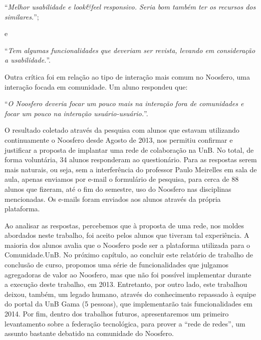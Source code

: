 \begin{center}
``\textit{Melhor usabilidade e look\&feel responsivo. Seria bom também ter os
recursos dos similares.}'';
\end{center}

e

\begin{center}
``\textit{Tem algumas funcionalidades que deveriam ser revista, levando em
consideração a usabilidade.}''.
\end{center}

Outra crítica foi em relação ao tipo de interação mais comum no Noosfero,
uma interação focada em comunidade. Um aluno respondeu que:

\begin{center}
``\textit{O Noosfero deveria focar um pouco mais na interação fora de
comunidades e focar um pouco na interação usuário-usuário.}''.
\end{center}


O resultado coletado através da pesquisa com alunos que estavam utilizando
continuamente o Noosfero desde Agosto de 2013, nos permitiu confirmar e
justificar a proposta de implantar uma rede de colaboração na UnB.
%
No total, de forma voluntária, 34 alunos responderam ao questionário. Para as
respostas serem mais naturais, ou seja, sem a interferência do professor Paulo
Meirelles em sala de aula, apenas enviamos por e-mail o formulário de pesquisa,
para cerca de 88 alunos que fizeram, até o fim do semestre, uso do Noosfero
nas disciplinas mencionadas.
%
Os e-mails foram enviados aos alunos através da própria plataforma.

Ao analisar as respostas, percebemos que à proposta de uma rede, nos moldes
abordados neste trabalho, foi aceito pelos alunos que tiveram tal experiência.
%
A maioria dos alunos avalia que o Noosfero pode ser a plataforma
utilizada para o Comunidade.UnB.
%
No próximo capítulo, ao concluir este relatório de trabalho de conclusão de curso,
propomos uma série de funcionalidades que julgamos agregadoras de valor ao
Noosfero, mas que não foi possível implementar durante a
execução deste trabalho, em 2013.
%
Entretanto, por outro lado, este trabalhou deixou, também, um legado humano,
através do conhecimento repassado à equipe do portal da UnB Gama (5 pessoas), que
implementarão tais funcionalidades em 2014.
%
Por fim, dentro dos trabalhos futuros, apresentaremos um primeiro levantamento
sobre a federação tecnológica, para prover a ``rede de redes'', um assunto
bastante debatido na comunidade do Noosfero.
